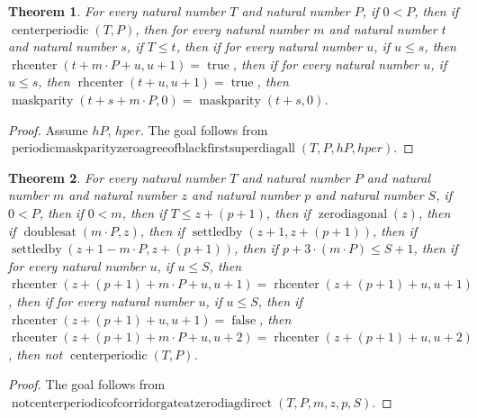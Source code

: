\documentclass[11pt]{article}
\newtheorem{theorem}{Theorem}[section]
\theoremstyle{definition}
\begin{document}
\begin{theorem}
\label{ll:paper:periodic-maskparity-zero-agree-of-black-first-superdiag-all}
For every natural number \(T\) and natural number \(P\), if \(0 < P\), then if \(\operatorname{centerperiodic}(T, P)\), then for every natural number \(m\) and natural number \(t\) and natural number \(s\), if \(T \le t\), then if for every natural number \(u\), if \(u \le s\), then \(\operatorname{rhcenter}(t + m \cdot P + u, u + 1) = \operatorname{true}\), then if for every natural number \(u\), if \(u \le s\), then \(\operatorname{rhcenter}(t + u, u + 1) = \operatorname{true}\), then \(\operatorname{maskparity}(t + s + m \cdot P, 0) = \operatorname{maskparity}(t + s, 0)\).
\end{theorem}
\begin{proof}
Assume \(hP\), \(hper\).
The goal follows from \(\operatorname{periodicmaskparityzeroagreeofblackfirstsuperdiagall}(T, P, hP, hper)\).
\end{proof}
\begin{theorem}
\label{ll:paper:not-centerperiodic-of-corridor-gate-at-zero-diag-direct}
For every natural number \(T\) and natural number \(P\) and natural number \(m\) and natural number \(z\) and natural number \(p\) and natural number \(S\), if \(0 < P\), then if \(0 < m\), then if \(T \le z + (p + 1)\), then if \(\operatorname{zerodiagonal}(z)\), then if \(\operatorname{doublesat}(m \cdot P, z)\), then if \(\operatorname{settledby}(z + 1, z + (p + 1))\), then if \(\operatorname{settledby}(z + 1 - m \cdot P, z + (p + 1))\), then if \(p + 3 \cdot (m \cdot P) \le S + 1\), then if for every natural number \(u\), if \(u \le S\), then \(\operatorname{rhcenter}(z + (p + 1) + m \cdot P + u, u + 1) = \operatorname{rhcenter}(z + (p + 1) + u, u + 1)\), then if for every natural number \(u\), if \(u \le S\), then if \(\operatorname{rhcenter}(z + (p + 1) + u, u + 1) = \operatorname{false}\), then \(\operatorname{rhcenter}(z + (p + 1) + m \cdot P + u, u + 2) = \operatorname{rhcenter}(z + (p + 1) + u, u + 2)\), then not \(\operatorname{centerperiodic}(T, P)\).
\end{theorem}
\begin{proof}
The goal follows from \(\operatorname{notcenterperiodicofcorridorgateatzerodiagdirect}(T, P, m, z, p, S)\).
\end{proof}
\end{document}
